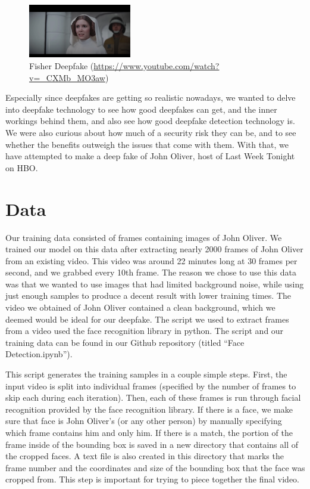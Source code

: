 \documentclass{article}
\begin{document}
\begin{figure}[!htbp]
\caption{Fisher Deepfake (\url{https://www.youtube.com/watch?v=_CXMb_MO3aw})}
\centering
\includegraphics[width=0.4\textwidth]{Fisher.png}
\end{figure}

Especially since deepfakes are getting so realistic nowadays, we wanted to delve into deepfake technology to see how good deepfakes can get, and the inner workings behind them, and also see how good deepfake detection technology is. We were also curious about how much of a security risk they can be, and to see whether the benefits outweigh the issues that come with them. With that, we have attempted to make a deep fake of John Oliver, host of Last Week Tonight on HBO.

\section{Data}
\label{gen_inst}

Our training data consisted of frames containing images of John Oliver. We trained our model on this data after extracting nearly 2000 frames of John Oliver from an existing video. This video was around 22 minutes long at 30 frames per second, and we grabbed every 10th frame. The reason we chose to use this data was that we wanted to use images that had limited background noise, while using just enough samples to produce a decent result with lower training times.  The video we obtained of John Oliver contained a clean background, which we deemed would be ideal for our deepfake. The script we used to extract frames from a video used the face recognition library in python. The script and our training data can be found in our Github repository (titled “Face Detection.ipynb”). 

This script generates the training samples in a couple simple steps. First, the input video is split into individual frames (specified by the number of frames to skip each during each iteration). Then, each of these frames is run through facial recognition provided by the face recognition library. If there is a face, we make sure that face is John Oliver’s (or any other person) by manually specifying which frame contains him and only him. If there is a match, the portion of the frame inside of the bounding box is saved in a new directory that contains all of the cropped faces. A text file is also created in this directory that marks the frame number and the coordinates and size of the bounding box that the face was cropped from. This step is important for trying to piece together the final video. 
\end{document}
